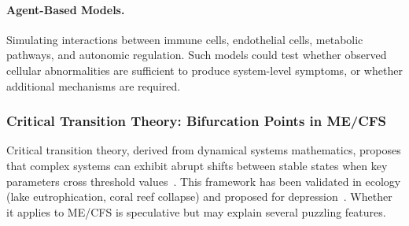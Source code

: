 \paragraph{Agent-Based Models.}
Simulating interactions between immune cells, endothelial cells, metabolic pathways, and autonomic regulation. Such models could test whether observed cellular abnormalities are sufficient to produce system-level symptoms, or whether additional mechanisms are required.

\subsubsection{Critical Transition Theory: Bifurcation Points in ME/CFS}
\label{subsubsec:critical-transitions}

Critical transition theory, derived from dynamical systems mathematics, proposes that complex systems can exhibit abrupt shifts between stable states when key parameters cross threshold values~\cite{Scheffer2009early}. This framework has been validated in ecology (lake eutrophication, coral reef collapse) and proposed for depression~\cite{vandeLeemput2014critical}. Whether it applies to ME/CFS is speculative but may explain several puzzling features.

